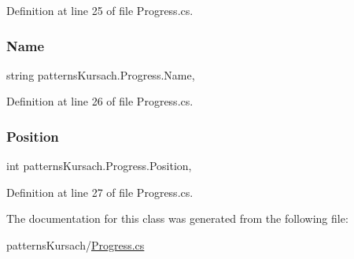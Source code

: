 Definition at line 25 of file Progress.\+cs.

\mbox{\label{classpatterns_kursach_1_1_progress_a8f55b8fc822cec0cc2cfb1b9d5c4c535}} 
\subsubsection{\texorpdfstring{Name}{Name}}
{\footnotesize\ttfamily string patterns\+Kursach.\+Progress.\+Name\hspace{0.3cm}{\ttfamily [get]}, {\ttfamily [set]}}



Definition at line 26 of file Progress.\+cs.

\mbox{\label{classpatterns_kursach_1_1_progress_ac6f738598992b81afb7bab6b646e8714}} 
\subsubsection{\texorpdfstring{Position}{Position}}
{\footnotesize\ttfamily int patterns\+Kursach.\+Progress.\+Position\hspace{0.3cm}{\ttfamily [get]}, {\ttfamily [set]}}



Definition at line 27 of file Progress.\+cs.



The documentation for this class was generated from the following file\+:\begin{DoxyCompactItemize}
\item 
patterns\+Kursach/\mbox{\hyperlink{_progress_8cs}{Progress.\+cs}}\end{DoxyCompactItemize}
